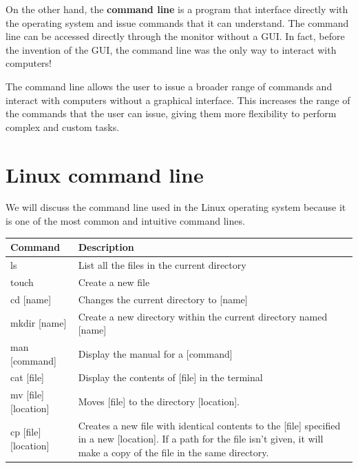 On the other hand, the \textbf{command line} is a program that  interface directly with the operating system and issue commands that it can understand. The command line can be accessed directly through the monitor without a GUI. In fact, before the invention of the GUI, the command line was the only way to interact with computers!  

The command line allows the user to issue a broader range of commands and interact with computers without a graphical interface. 
This increases the range of the commands that the user can issue, giving them more flexibility to perform complex and custom tasks. \\

\section{Linux command line}

We will discuss the command line used in the Linux operating system because it is one of the most common and intuitive command lines. \\

\begin{center}
    \begin{tabular}{| l | p{75mm} | }
      \hline
      Command & Description \\ \hline
      ls & List all the files in the current directory \\ \hline
      touch & Create a new file \\ \hline
      cd [name] & Changes the current directory to [name] \\ \hline
      mkdir [name] & Create a new directory within the current directory named [name] \\ \hline
      man [command] & Display the manual for a [command] \\ \hline
      cat [file] & Display the contents of [file] in the terminal \\ \hline
      mv [file] [location] & Moves [file] to the directory [location]. \\ \hline 
      cp [file] [location] & Creates a new file with identical contents to the [file] specified in a new [location]. If a path for the file isn’t given, it will make a copy of the file in the same directory. \\ \hline
    \end{tabular}
\end{center}
  

